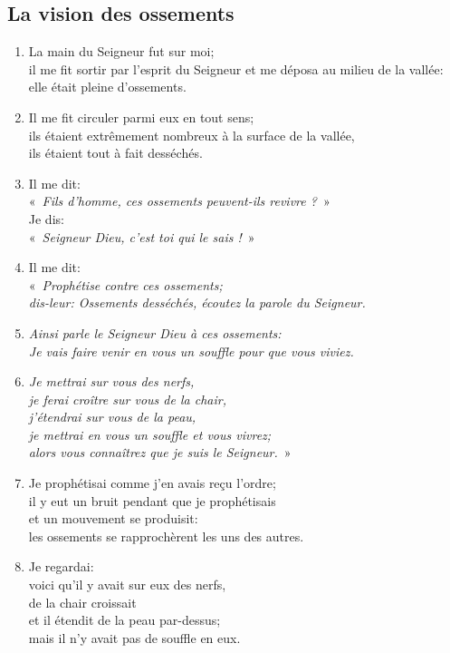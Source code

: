 \subsection*{La vision des ossements}
\begin{enumerate}[leftmargin=\psleftmargin, labelsep = \pslabelsep, label={\arabic*}, font=\color{\pscolor}\small\textsuperscript, parsep=0em, itemsep=0em, topsep=0em ]
\item La main du Seigneur fut sur moi; \\ il me fit sortir par l’esprit du Seigneur et me déposa au milieu de la vallée: \\ elle était pleine d’ossements.
\item Il me fit circuler parmi eux en tout sens; \\ ils étaient extrêmement nombreux à la surface de la vallée, \\ ils étaient tout à fait desséchés.
\item Il me dit: \\ \decalage «~\textit{Fils d’homme, ces ossements peuvent-ils revivre ?}~» \\ Je dis: \\
\decalage «~\textit{Seigneur Dieu, c’est toi qui le sais !}~»
\item Il me dit: \\ \decalage «~\textit{Prophétise contre ces ossements; \\ \decalage dis-leur: Ossements desséchés, écoutez la parole du Seigneur.}
\item \decalage \textit{Ainsi parle le Seigneur Dieu à ces ossements: \\ \decalage Je vais faire venir en vous un souffle pour que vous viviez.}
\item \decalage \textit{Je mettrai sur vous des nerfs, \\ \decalage je ferai croître sur vous de la chair, \\ \decalage j’étendrai sur vous de la peau, \\ \decalage je mettrai en vous un souffle et vous vivrez; \\ \decalage alors vous connaîtrez que je suis le Seigneur.}~»
\item Je prophétisai comme j’en avais reçu l’ordre; \\ il y eut un bruit pendant que je prophétisais \\ et un mouvement se produisit: \\ les ossements se rapprochèrent les uns des autres.
\item Je regardai: \\ voici qu’il y avait sur eux des nerfs, \\ de la chair croissait \\ et il étendit de la peau par-dessus; \\ mais il n’y avait pas de souffle en eux.\verseSpace

\end{enumerate}
